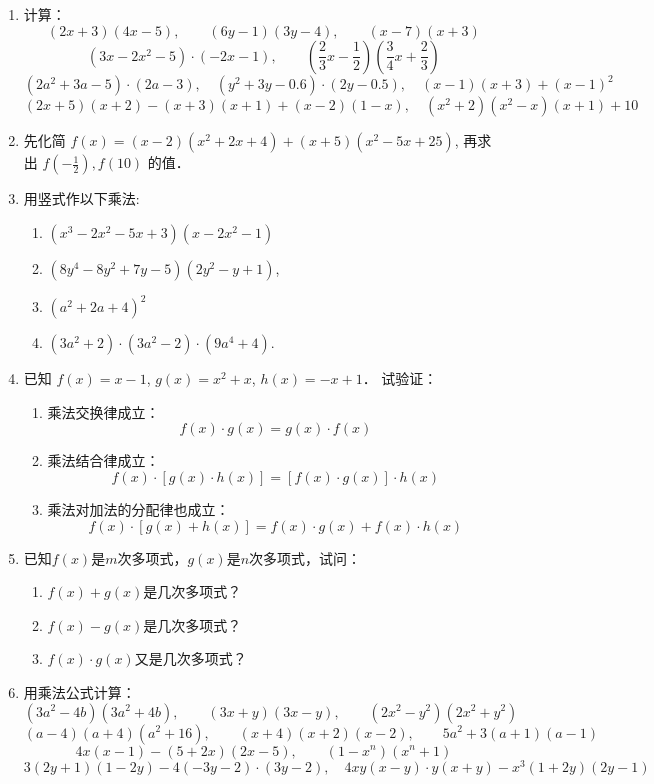 \begin{enumerate}
\item 计算：
\[(2x+3)(4x-5),\qquad  (6y-1)(3y-4),\qquad  (x-7)(x+3)\]
\[(3x-2x^2-5)\cdot (-2x-1),\qquad  \left(\frac{2}{3} x-\frac{1}{2}\right)\left(\frac{3}{4} x+\frac{2}{3}\right)\]
\[\left(2 a^{2}+3 a-5\right) \cdot(2 a-3),\quad  \left(y^{2}+3 y-0.6\right) \cdot(2 y-0.5),\quad  (x-1)(x+3)+(x-1)^{2}\]
\[(2 x+5)(x+2)-(x+3)(x+1)+(x-2)(1-x),\quad  \left(x^{2}+2\right)\left(x^{2}-x\right)(x+1)+10\]


\item 先化简 $f(x)=(x-2)\left(x^{2}+2 x+4\right)+(x+5)(x^{2}-5 x+25)$, 再求出 $f\left(-\frac{1}{2}\right), f(10)$ 的值．
\item 用竖式作以下乘法:
\begin{enumerate}
    \item $\left(x^{3}-2 x^{2}-5 x+3\right)\left(x-2 x^{2}-1\right)$
    \item $\left(8 y^{4}-8 y^{2}+7 y-5\right)\left(2 y^{2}-y+1\right)$,
    \item $\left(a^{2}+2 a+4\right)^{2}$
    \item $\left(3 a^{2}+2\right) \cdot\left(3 a^{2}-2\right) \cdot\left(9 a^{4}+4\right)$.
\end{enumerate}

\item 已知 $f(x)=x-1$, $g(x)=x^{2}+x$, $h(x)=-x+1$．
试验证：
\begin{enumerate}
    \item 乘法交换律成立： $$f(x) \cdot g(x)=g(x) \cdot f(x)$$
    \item 乘法结合律成立： $$f(x) \cdot[g(x) \cdot h(x)]=[f(x) \cdot g(x)] \cdot h(x)$$
    \item 乘法对加法的分配律也成立：$$f(x) \cdot[g(x) + h(x)]=f(x) \cdot g(x)+f(x) \cdot h(x)$$
\end{enumerate}

\item 已知$f(x)$是$m$次多项式，$g(x)$是$n$次多项式，试问：
\begin{enumerate}
    \item $f(x)+g(x)$是几次多项式？
    \item $f(x)-g(x)$是几次多项式？
    \item $f(x)·g(x)$又是几次多项式？
\end{enumerate}

\item 用乘法公式计算：
\[(3a^2-4b) (3a^2+4b),\qquad  (3x+y) (3x-y),\qquad  (2x^2-y^2) (2x^2+y^2)\]
\[(a-4) (a+4)(a^2+16),\qquad  (x+4) (x+2)(x-2),\qquad  5a^2+3 (a+1) (a-1)\]
\[4x (x-1) - (5+2x) (2x-5),\qquad  (1-x^n) (x^n+1)\]
\[  3 (2y+1) (1-2y)-4(-3y-2)\cdot (3y-2),\quad  4xy (x-y) \cdot y (x+y) - x^3 (1+2y) (2y-1)\]


\end{enumerate}
